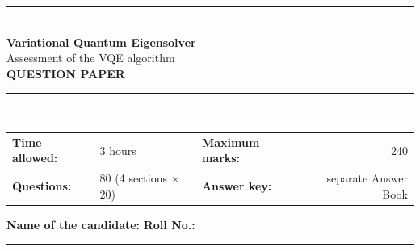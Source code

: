 \documentclass[11pt,a4paper]{article}
\begin{document}
\pagestyle{fancy}\fancyhf{}
\renewcommand{\headrulewidth}{0.4pt}

\thispagestyle{empty}
\begin{center}
{\color{brand}\rule{\linewidth}{1.2pt}}\\[6pt]
{\Huge\bfseries\color{brand} Variational Quantum Eigensolver}\\[4pt]
{\Large Assessment of the VQE algorithm}\\[4pt]
{\large\bfseries QUESTION PAPER}\\[2pt]
{\color{brand}\rule{\linewidth}{1.2pt}}\\[1pt]
\end{center}
\vspace{-2pt}
\begin{tabularx}{\linewidth}{@{}lXlr@{}}
\textbf{Time allowed:} & 3 hours & \textbf{Maximum marks:} & 240\\
\textbf{Questions:} & 80 (4 sections $\times$ 20) & \textbf{Answer key:} & separate Answer Book
\end{tabularx}
\vspace{6pt}

\textbf{Name of the candidate:} \hrulefill\quad \textbf{Roll No.:} \rule{35mm}{0.4pt}
\end{document}
